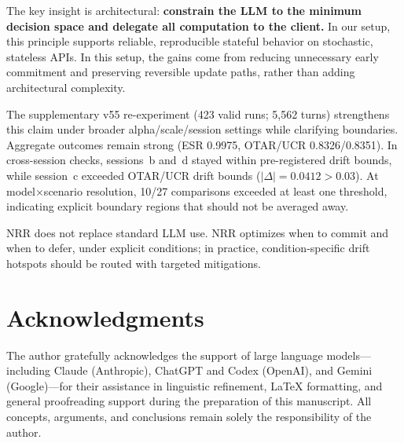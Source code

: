 \documentclass[11pt,a4paper]{article}
\begin{document}
The key insight is architectural: \textbf{constrain the LLM to the minimum
decision space and delegate all computation to the client.} In our setup, this principle
supports reliable, reproducible stateful behavior on stochastic, stateless APIs.
In this setup, the gains come from reducing unnecessary early commitment and preserving reversible update paths, rather than adding architectural complexity.

The supplementary v55 re-experiment (423 valid runs; 5{,}562 turns) strengthens
this claim under broader alpha/scale/session settings while clarifying
boundaries. Aggregate outcomes remain strong (ESR 0.9975, OTAR/UCR
0.8326/0.8351). In cross-session checks, sessions~b and~d stayed within
pre-registered drift bounds, while session~c exceeded OTAR/UCR drift bounds
($|\Delta|=0.0412 > 0.03$). At model$\times$scenario resolution, 10/27
comparisons exceeded at least one threshold, indicating explicit boundary
regions that should not be averaged away.

NRR does not replace standard LLM use. NRR optimizes when to commit and when to
defer, under explicit conditions; in practice, condition-specific drift hotspots
should be routed with targeted mitigations.

\section*{Acknowledgments}

The author gratefully acknowledges the support of large language 
models---including Claude (Anthropic), ChatGPT and Codex (OpenAI), and 
Gemini (Google)---for their assistance in linguistic refinement, 
LaTeX formatting, and general proofreading support during the 
preparation of this manuscript.
All concepts, arguments, and conclusions remain solely the 
responsibility of the author.
\end{document}
